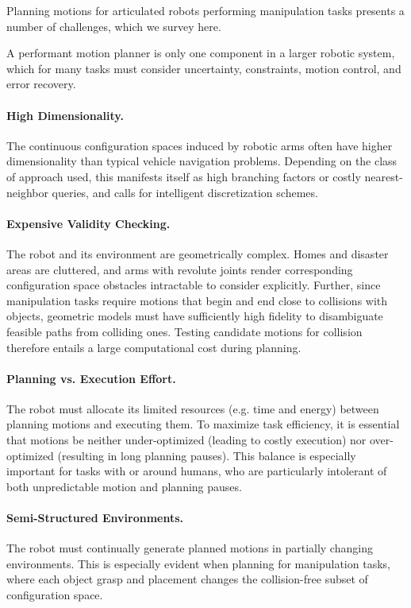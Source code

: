 Planning motions for articulated robots performing manipulation tasks
presents a number of challenges,
which we survey here.

A performant motion planner is only one component in a larger
robotic system,
which for many tasks must consider uncertainty, constraints,
motion control, and error recovery.

\paragraph{High Dimensionality.}
The continuous configuration spaces induced by robotic arms
often have higher dimensionality than typical vehicle navigation
problems.
Depending on the class of approach used,
this manifests itself as high branching factors
or costly nearest-neighbor queries,
and calls for intelligent discretization schemes.

\paragraph{Expensive Validity Checking.}
The robot and its environment are geometrically complex.
Homes and disaster areas are cluttered,
and arms with revolute joints render corresponding 
configuration space obstacles intractable to consider explicitly.
Further, since manipulation tasks require
motions that begin and end close to collisions with objects,
geometric models must have sufficiently high fidelity
to disambiguate feasible paths from colliding ones.
Testing candidate motions for collision therefore entails a
large computational cost during planning.

\paragraph{Planning vs. Execution Effort.}
The robot must allocate its limited resources
(e.g. time and energy) between planning motions and executing them.
To maximize task efficiency,
it is essential that motions be neither under-optimized
(leading to costly execution)
nor over-optimized (resulting in long planning pauses).
This balance is especially important for tasks with or around
humans,
who are particularly intolerant of both unpredictable motion
and planning pauses.

\paragraph{Semi-Structured Environments.}
The robot must continually generate planned motions in partially
changing environments.
This is especially evident when planning for manipulation tasks,
where each object grasp and placement changes the collision-free
subset of configuration space.

